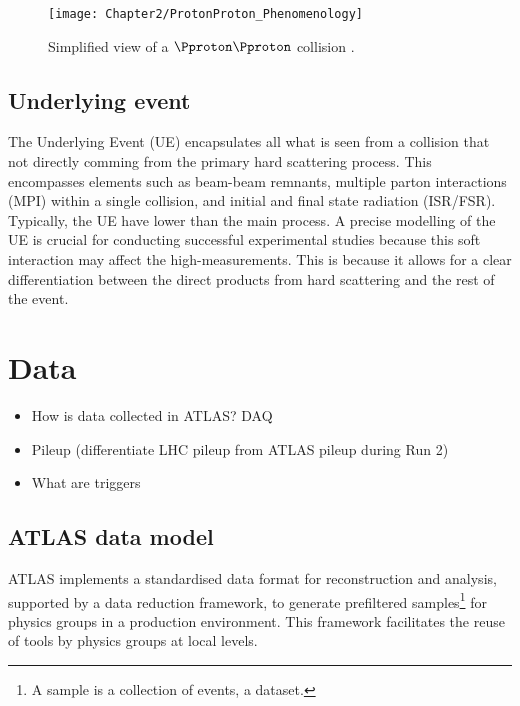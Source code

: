 \begin{figure}
 	  \centering
	\texttt{[image: Chapter2/ProtonProton\_Phenomenology]}
	\caption{Simplified view of a $\Pproton \Pproton$ collision \cite{Hoecker:2016vvy}.}
	\label{fig:Chap2:ProtonProton_Collision}
\end{figure} 


\subsection{Underlying event}
\label{sec:Chap1:PhenoOfPP:UE}
The Underlying Event (UE) encapsulates all what is seen from a collision that not directly comming
from the primary hard scattering process. This encompasses elements such as beam-beam remnants, 
multiple parton interactions (MPI) within a single collision, and initial and final state radiation (ISR/FSR). 
Typically, the UE have lower \pT than the main process.
A precise modelling of the UE is crucial for conducting successful experimental studies because
this soft interaction may affect the high-\pT measurements.
This is because it allows for a clear differentiation between the direct products 
from hard scattering and the rest of the event. 




\section{Data}
\label{sec:Chap3.1:Data}
\begin{itemize}
	\item How is data collected in ATLAS? DAQ
	\item Pileup (differentiate LHC pileup from ATLAS pileup during Run 2)
	\item What are triggers
\end{itemize}



%
%
\subsection{ATLAS data model}
\label{sec:Chap3.1:Data:Model}
ATLAS implements a standardised data format for reconstruction and analysis, 
supported by a data reduction framework, to generate prefiltered samples\footnote{A 
sample is a collection of events, a dataset.} for 
physics groups in a production environment. This framework facilitates the reuse 
of tools by physics groups at local levels. \cite{Buckley:2015tjh} %

